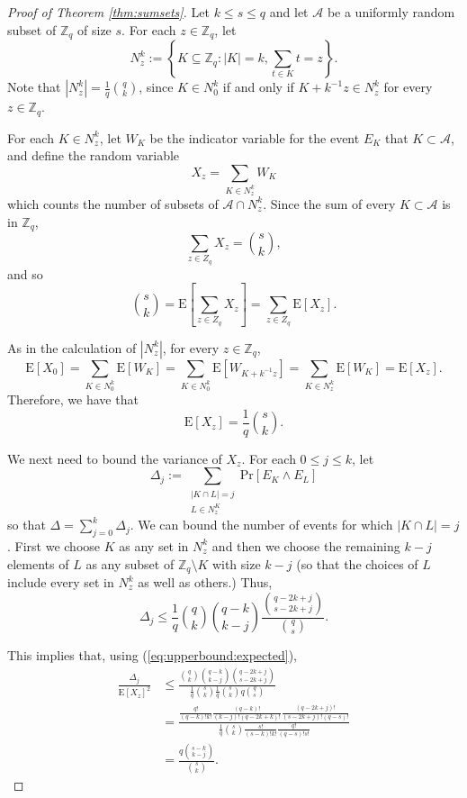 \documentclass[11pt]{amsart}
\theoremstyle{definition}
\theoremstyle{remark}
\def\ZZ{\ensuremath{\mathbb{Z}}}
\def\cA{\ensuremath{\mathcal{A}}}
\def\Pr{\ensuremath{\mathrm{Pr}}}
\def\EE{\ensuremath{\mathrm{E}}}
\begin{document}
\begin{proof}[Proof of Theorem \ref{thm:sumsets}] Let $k \leq s \leq q$ and let $\cA$ be a uniformly random subset of $\ZZ_q$ of size $s$. For each $z \in \ZZ_q$, let
  \[N_z^k := \left\{K \subseteq \mathbb{Z}_q: |K| = k, \sum_{t \in K} t = z\right\}.\]
  Note that $|N_z^k| = \frac{1}{q}{\binom{q}{k}}$, since $K \in N_0^k$ if and only if $K + k^{-1}z \in N_z^k$ for every $z \in \mathbb{Z}_q$.

  For each $K \in N_z^k$, let $W_K$ be the indicator variable for the event $E_K$ that $K \subset \cA$, and define the random variable
  \[X_z = \sum_{K \in N_z^k} W_K\]
  which counts the number of subsets of $\cA \cap N_z^k$.  Since the sum of every $K \subset \cA$ is in $\mathbb{Z}_q$,
\[\sum_{z \in Z_q} X_z = {\binom{s}{k}},\]
and so
\[\binom{s}{k} = \EE\left[\sum_{z \in Z_q} X_z\right] =  \sum_{z \in Z_q} \EE[X_z].\]\par
As in the calculation of $|N_z^k|$, for every $z \in \mathbb{Z}_q$, 
\[\EE[X_0] = \sum_{K \in N_0^k}\EE[W_K] = \sum_{K \in N_0^k} \EE[W_{K + k^{-1}z}] = \sum_{K \in N_z^k} \EE[W_K] = \EE[X_z].\]
Therefore, we have that
\begin{equation} \label{eq:upperbound:expected}
\EE[X_z] = \frac{1}{q} {\binom{s}{k}}.
\end{equation}

We next need to bound the variance of $X_z$. For each $0 \leq j \leq k$, let
\[\Delta_j := \sum_{\substack{|K \cap L| = j \\ L \in N_z^K}} \Pr[E_K \land E_L]\]
so that $\Delta = \sum_{j=0}^k \Delta_j$. We can bound the number of events for which $|K \cap L| = j$. First we choose $K$ as any set in $N_z^k$ and then we choose the remaining $k- j$ elements of $L$ as any subset of $\mathbb{Z}_q \setminus K$ with size $k - j$ (so that the choices of $L$ include every set in $N_z^k$ as well as others.) Thus, 
\[\Delta_j \leq \frac{1}{q}\binom{q}{k}\binom{q - k}{k - j} \frac{\binom{q - 2k + j}{s - 2k + j}}{\binom{q}{s}}.\]

This implies that, using (\ref{eq:upperbound:expected}),
\begin{align*}
    \frac{\Delta_j}{\EE[X_z]^2} &\leq \frac{\binom{q}{k} \binom{q - k}{k - j}\binom{q - 2k + j}{s - 2k + j}}{\frac{1}{q} \binom{s}{k}\frac{1}{q} \binom{s}{k}q\binom{q}{s}} \\
    &= \frac{\frac{q!}{(q - k)!k!}\frac{(q - k)!}{(k - j)!(q - 2k + k)!}\frac{(q - 2k + j)!}{(s - 2k + j)!(q - s)!}}{\frac{1}{q}\binom{s}{k}\frac{s!}{(s - k)!k!}\frac{q!}{(q - s)!s!}} \\
    &= \frac{q\binom{s - k}{k - j}}{\binom{s}{k}}.
\end{align*}


\end{proof}
\end{document}
